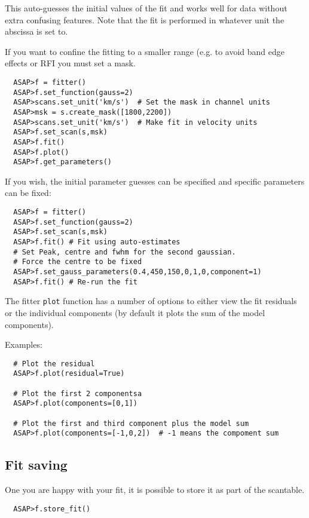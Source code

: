 \documentclass[11pt]{article}
\newcommand{\cmd}[1]{{\tt #1}}
\begin{document}
This auto-guesses the initial values of the fit and works well for data
without extra confusing features. Note that the fit is performed in
whatever unit the abscissa is set to.

If you want to confine the fitting to a smaller range (e.g. to avoid
band edge effects or RFI you must set a mask.

\begin{verbatim}
  ASAP>f = fitter()
  ASAP>f.set_function(gauss=2)
  ASAP>scans.set_unit('km/s')  # Set the mask in channel units
  ASAP>msk = s.create_mask([1800,2200])
  ASAP>scans.set_unit('km/s')  # Make fit in velocity units
  ASAP>f.set_scan(s,msk)
  ASAP>f.fit()
  ASAP>f.plot()
  ASAP>f.get_parameters()
\end{verbatim}

If you wish, the initial parameter guesses can be specified and
specific parameters can be fixed:

\begin{verbatim}
  ASAP>f = fitter()
  ASAP>f.set_function(gauss=2)
  ASAP>f.set_scan(s,msk)
  ASAP>f.fit() # Fit using auto-estimates
  # Set Peak, centre and fwhm for the second gaussian.
  # Force the centre to be fixed
  ASAP>f.set_gauss_parameters(0.4,450,150,0,1,0,component=1)
  ASAP>f.fit() # Re-run the fit
\end{verbatim}

The fitter \cmd{plot} function has a number of options to either view
the fit residuals or the individual components (by default it plots
the sum of the model components).

Examples:

\begin{verbatim}
  # Plot the residual
  ASAP>f.plot(residual=True)

  # Plot the first 2 componentsa
  ASAP>f.plot(components=[0,1])

  # Plot the first and third component plus the model sum
  ASAP>f.plot(components=[-1,0,2])  # -1 means the compoment sum
\end{verbatim}

\subsection{Fit saving}

One you are happy with your fit, it is
possible to store it as part of the scantable.

\begin{verbatim}
  ASAP>f.store_fit()
\end{verbatim}
\end{document}
